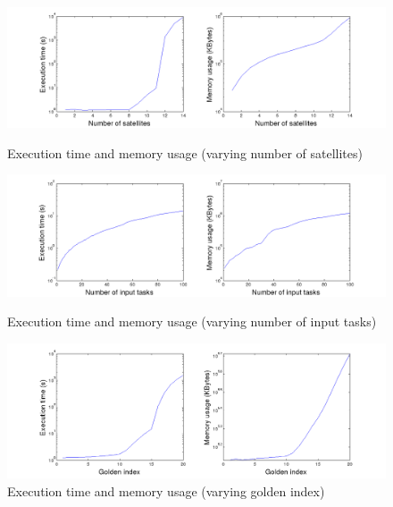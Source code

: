 \begin{figure}[ht]
  \begin{minipage}[b]{\linewidth}
    \includegraphics[width=\linewidth]{Figures/tmLG_slim.png}
    \caption{Execution time and memory usage (varying number of satellites)}\label{fig_tmLG_slim}
  \end{minipage}
  
  \begin{minipage}[b]{\linewidth}
    \includegraphics[width=\linewidth]{Figures/tmLG_alim.png}
    \caption{Execution time and memory usage (varying number of input tasks)}\label{fig_tmLG_alim}
  \end{minipage}  

  \begin{minipage}[b]{\linewidth}
    \includegraphics[width=\linewidth]{Figures/tmLG_glim.png}
    \caption{Execution time and memory usage (varying golden index)}\label{fig_tmLG_glim}
  \end{minipage}
  \hfill
\end{figure}

